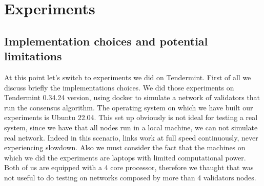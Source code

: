 \documentclass{article}
\begin{document}
	\section{Experiments}
	\subsection{Implementation choices and potential limitations}
	At this point let's switch to experiments we did on Tendermint. First of all we discuss briefly the implementations choices. We did those experiments on Tendermint 0.34.24 version, using docker to simulate a network of validators that run the consensus algorithm. The operating system on which we have built our experiments is Ubuntu 22.04. This set up obviously is not ideal for testing a real system, since we have that all nodes run in a local machine, we can not simulate real network. Indeed in this scenario, links work at full speed continuously, never experiencing slowdown. Also we must consider the fact that the machines on which we did the experiments are laptops with limited computational power. Both of us are equipped with a 4 core processor, therefore we thaught that was not useful to do testing on networks composed by more than 4 validators nodes.
\end{document}
